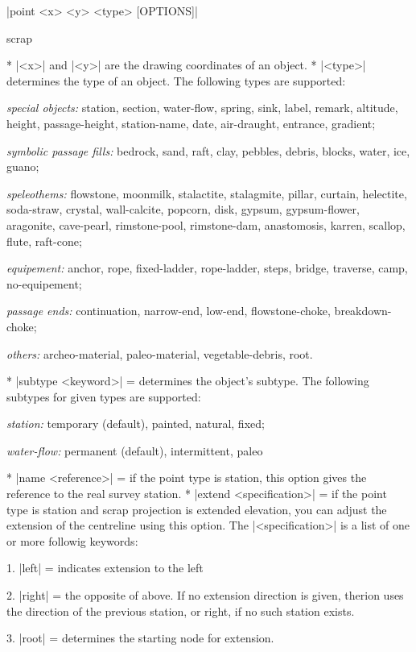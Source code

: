 \syntax
  |point <x> <y> <type> [OPTIONS]|
\endsyntax

\context
  scrap
\endcontext

\arguments
  * |<x>| and |<y>| are the drawing coordinates of an object.
  * |<type>| determines the type of an object. The following
    types are supported: 

    {\it special objects:} station, section, water-flow, spring, sink,
    label, remark, altitude, height, passage-height, station-name,
    date, air-draught, entrance, gradient;

    {\it symbolic passage fills:} bedrock, sand, raft, clay, pebbles,
    debris, blocks, water, ice, guano;

    {\it speleothems:} flowstone, moonmilk, stalactite, stalagmite,
    pillar, curtain, helectite, soda-straw, crystal, wall-calcite,
    popcorn, disk, gypsum, gypsum-flower, aragonite, cave-pearl,
    rimstone-pool, rimstone-dam, anastomosis, karren, scallop,
    flute, raft-cone;

    {\it equipement:} anchor, rope, fixed-ladder, rope-ladder, steps,
    bridge, traverse, camp, no-equipement;

    {\it passage ends:} continuation, narrow-end, low-end, flowstone-choke,
    breakdown-choke;

    {\it others:} archeo-material, paleo-material, vegetable-debris, root.
\endarguments


\options
  * |subtype <keyword>| = determines the object's subtype. The following
    subtypes for given types are supported: 
    
    {\it station:} temporary (default), painted, natural, fixed;

    {\it water-flow:} permanent (default), intermittent, paleo

  * |name <reference>| = if the point type is station, this
    option gives the reference to the real survey station.
  * |extend <specification>| = if the point type is station and scrap
    projection is extended elevation, you can
    adjust the extension of the centreline using this option. The |<specification>| is a list
    of one or more followig keywords:

    1. |left| = indicates extension to the left

    2. |right| = the opposite of above. If no extension direction is
       given, therion uses the direction of the previous station, or
       right, if no such station exists.

    3. |root| = determines the starting node for extension.

